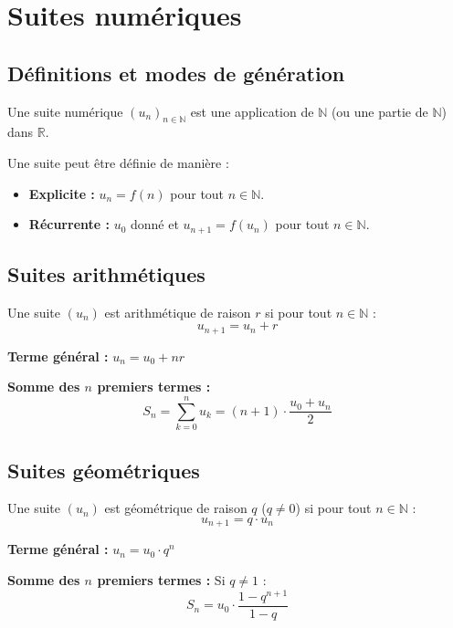 \section{Suites numériques}

\subsection{Définitions et modes de génération}

\begin{definition}
Une suite numérique $(u_n)_{n \in \mathbb{N}}$ est une application de $\mathbb{N}$ (ou une partie de $\mathbb{N}$) dans $\mathbb{R}$.
\end{definition}

Une suite peut être définie de manière :
\begin{itemize}
\item \textbf{Explicite :} $u_n = f(n)$ pour tout $n \in \mathbb{N}$.
\item \textbf{Récurrente :} $u_0$ donné et $u_{n+1} = f(u_n)$ pour tout $n \in \mathbb{N}$.
\end{itemize}

\subsection{Suites arithmétiques}

\begin{definition}
Une suite $(u_n)$ est arithmétique de raison $r$ si pour tout $n \in \mathbb{N}$ :
$$u_{n+1} = u_n + r$$
\end{definition}

\textbf{Terme général :} $u_n = u_0 + nr$

\textbf{Somme des $n$ premiers termes :}
$$S_n = \sum_{k=0}^{n} u_k = (n+1) \cdot \dfrac{u_0 + u_n}{2}$$

\subsection{Suites géométriques}

\begin{definition}
Une suite $(u_n)$ est géométrique de raison $q$ ($q \neq 0$) si pour tout $n \in \mathbb{N}$ :
$$u_{n+1} = q \cdot u_n$$
\end{definition}

\textbf{Terme général :} $u_n = u_0 \cdot q^n$

\textbf{Somme des $n$ premiers termes :}
Si $q \neq 1$ :
$$S_n = u_0 \cdot \dfrac{1 - q^{n+1}}{1 - q}$$

